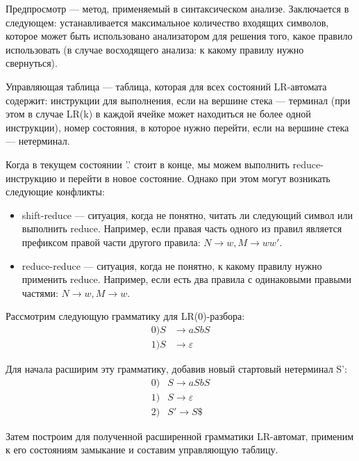 \begin{definition}
Предпросмотр --- метод, применяемый в синтаксическом анализе. Заключается в следующем: устанавливается максимальное количество входящих символов, которое может быть использовано анализатором для решения того, какое правило использовать (в случае восходящего анализа: к какому правилу нужно свернуться).
\end{definition}

\begin{definition}
Управляющая таблица --- таблица, которая для всех состояний LR-автомата содержит: инструкции для выполнения, если на вершине стека --- терминал (при этом в случае LR(k) в каждой ячейке может находиться не более одной инструкции), номер состояния, в которое нужно перейти, если на вершине стека --- нетерминал.
\end{definition}

Когда в текущем состоянии '.' стоит в конце, мы можем выполнить reduce-инструкцию и перейти в новое состояние. Однако при этом могут возникать следующие конфликты:
\begin{itemize}
\item shift-reduce --- ситуация, когда не понятно, читать ли следующий символ или выполнить reduce. Например, если правая часть одного из правил является префиксом правой части другого правила: $N \rightarrow w, M \rightarrow ww'$.
\item reduce-reduce --- ситуация, когда не понятно, к какому правилу нужно применить reduce. Например, если есть два правила с одинаковыми правыми частями: $N \rightarrow w, M \rightarrow w$.
\end{itemize}

Рассмотрим следующую грамматику для LR(0)-разбора:
\begin{align*}
0) S & \rightarrow a S b S \\
1) S & \rightarrow \varepsilon
\end{align*}

Для начала расширим эту грамматику, добавив новый стартовый нетерминал S':
\begin{align*}
0) & S \rightarrow a S b S \\
1) & S \rightarrow \varepsilon \\
2) & S' \rightarrow S \$
\end{align*}

Затем построим для полученной расширенной грамматики LR-автомат, применим к его состояниям замыкание и составим управляющую таблицу. 

